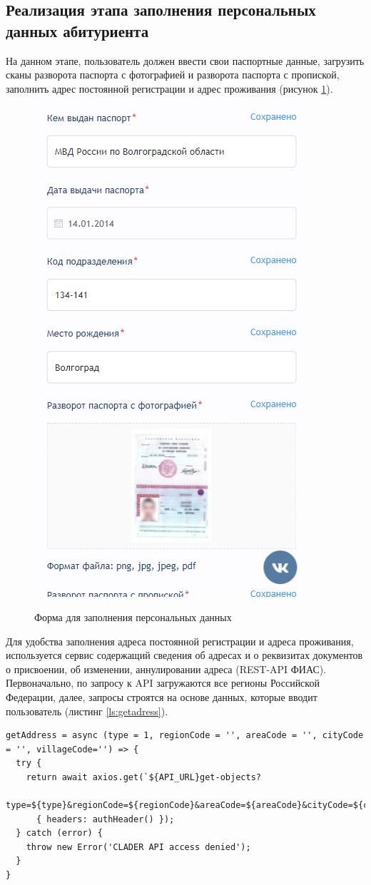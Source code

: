 \subsection{Реализация этапа заполнения персональных данных абитуриента}

На данном этапе, пользователь должен ввести свои паспортные данные, загрузить сканы разворота паспорта с фотографией и разворота паспорта с пропиской, заполнить адрес постоянной регистрации и адрес проживания (рисунок \ref{fig:personaldata}).

\begin{figure}[H]
\begin{center}
\includegraphics[width=0.5\hsize]{fig/passport.png}\\[2mm]
\caption{Форма для заполнения персональных данных}\label{fig:personaldata}
\end{center}
\end{figure}

Для удобства заполнения адреса постоянной регистрации и адреса проживания, используется сервис содержащий сведения об адресах и о реквизитах документов о присвоении, об изменении, аннулировании адреса (REST-API ФИАС). Первоначально, по запросу к API загружаются все регионы Российской Федерации, далее, запросы строятся на основе данных, которые вводит пользователь (листинг \ref{ls:getadress}).

\begin{lstlisting}[caption={Метод реализующий генерацию запросов в API сервиса ФИАС}, label={ls:getadress}]
getAddress = async (type = 1, regionCode = '', areaCode = '', cityCode = '', villageCode='') => {
  try {
    return await axios.get(`${API_URL}get-objects?
      type=${type}&regionCode=${regionCode}&areaCode=${areaCode}&cityCode=${cityCode}&villageCode=${villageCode}`,
      { headers: authHeader() });
  } catch (error) {
    throw new Error('CLADER API access denied');
  }
}
\end{lstlisting}

